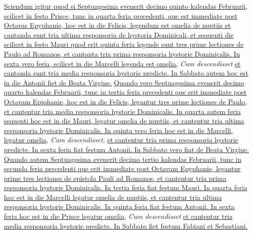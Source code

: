 \begin{multicols*}{2}
\newline \ul{Sciendum igitur quod si Septuagesima evenerit decimo quinto kalendas Februarii, scilicet in festo Prisce, tunc in quarta feria precedenti, que est immediate post Octavas Epyphanie, hoc est in die Felicis, legendum est omelia de nuptiis et cantanda sunt tria ultima responsoria de hystoria Dominicali, et sequenti die scilicet in festo Mauri quod erit quinta feria legende sunt tres prime lectiones de Paulo ad Romanos, et cantanta tria prima responsoria hystorie Dominicalis. In sexta vero feria, scilicet in die Marcelli legenda est omelia,} \textit{Cum descendisset} \ul{et cantanda sunt tria media responsoria hystorie predicte. In Sabbato autem hoc est in die Antonii fiet de Beata Virgine.}
\newline \ul{Quando vero Septuagesima evenerit decimo quarto kalendas Februarii, tunc in tertia feria precedenti que erit immediate post Octavam Epiphanie, hoc est in die Felicis, legantur tres prime lectiones de Paulo, et cantentur tria media responsoria hystorie Dominicalis. In quarta autem feria sequenti hoc est in die Mauri, legatur omelia de nuptiis, et cantentur tria ultima responsoria hystorie Dominicalis. In quinta vero feria hoc est in die Marcelli, legatur omelia,} \textit{Cum descendisset,} \ul{et cantentur tria prima responsoria hystorie predicte. In sexta feria fiat festum Antonii. In Sabbato vero fiat de Beata Virgine.
Quando autem Septuagesima evenerit decimo tertio kalendas Februarii, tunc in secunda feria precedenti que erit immediate post Octavam Epyphanie, legantur prime tres lectiones de epistola Pauli ad Romanos, et cantentur tria prima responsoria hystorie Dominicalis. In tertia feria fiat festum Mauri. In quarta feria hoc est in die Marcelli legatur omelia de nuptiis, et cantentur tria ultima responsoria hystorie Dominicalis. In quinta feria fiat festum Antonii. In sexta feria hoc est in die Prisce legatur omelia,} \textit{Cum descendisset} \ul{et cantentur tria media responsoria hystorie predicte. In Sabbato fiet festum Fabiani et Sebastiani.}
{\color{Red} }

\end{multicols*}
